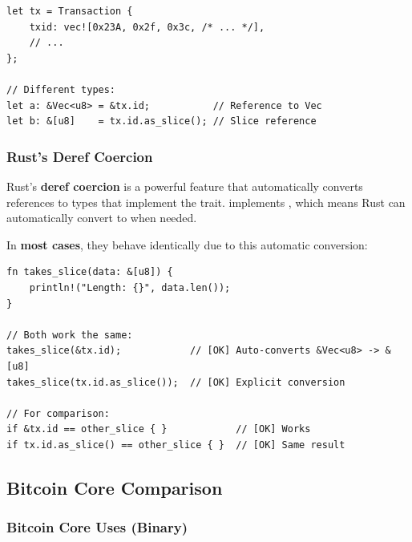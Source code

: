 \begin{listing}[H]
\caption{Reference types for transaction IDs}
\label{lst:ch06-11}
\begin{verbatim}
let tx = Transaction {
    txid: vec![0x23A, 0x2f, 0x3c, /* ... */],
    // ...
};

// Different types:
let a: &Vec<u8> = &tx.id;           // Reference to Vec
let b: &[u8]    = tx.id.as_slice(); // Slice reference
\end{verbatim}
\end{listing}

\subsubsection{Rust's Deref Coercion}
\label{sec:ch06-deref-coercion}

Rust's \textbf{deref coercion} is a powerful feature that automatically converts references to types that implement the  trait.  implements , which means Rust can automatically convert  to \code{\&[u8]} when needed.

In \textbf{most cases}, they behave identically due to this automatic conversion:

\begin{listing}[H]
\caption{Deref coercion in action}
\label{lst:ch06-12}
\begin{verbatim}
fn takes_slice(data: &[u8]) {
    println!("Length: {}", data.len());
}

// Both work the same:
takes_slice(&tx.id);            // [OK] Auto-converts &Vec<u8> -> &[u8]
takes_slice(tx.id.as_slice());  // [OK] Explicit conversion

// For comparison:
if &tx.id == other_slice { }            // [OK] Works
if tx.id.as_slice() == other_slice { }  // [OK] Same result
\end{verbatim}
\end{listing}

\subsection{Bitcoin Core Comparison}
\label{sec:ch06-bitcoin-core-comparison}

\subsubsection{Bitcoin Core Uses  (Binary)}
\label{sec:ch06-bitcoin-uint256}

